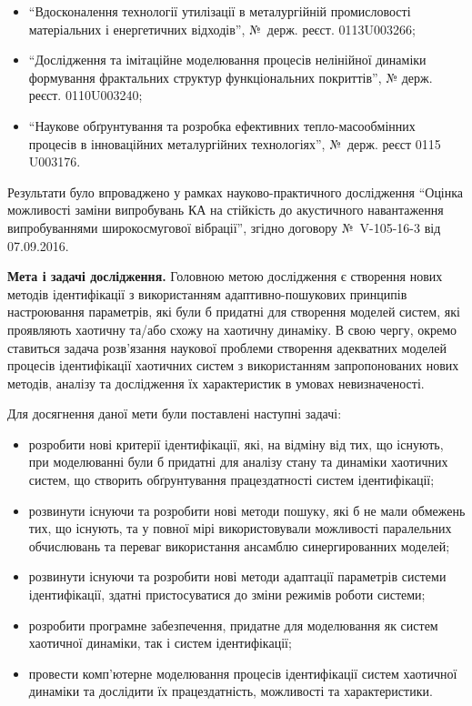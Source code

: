 \documentclass[a4paper,13pt]{atuaref}
\begin{document}
\begin{itemize}


\item
  ``Вдосконалення технології утилізації в металургійній промисловості
  матеріальних і енергетичних відходів'', №~держ. реєст. 0113U003266;

  \item
  ``Дослідження та імітаційне моделювання процесів нелінійної динаміки
  формування фрактальних структур функціональних   покриттів'',
  № держ. реєст. 0110U003240;

  \item
  ``Наукове обґрунтування та розробка ефективних тепло-масообмінних
  процесів в інноваційних металургійних технологіях'', №~держ. реєст 0115 U003176.

\end{itemize}

Результати було впроваджено у рамках науково-практичного дослідження
``Оцінка    можливості заміни випробувань КА на стійкість до акустичного навантаження
випробуваннями широкосмугової вібрації'', згідно договору №~V-105-16-3 від 07.09.2016.

\textbf{Мета і задачі дослідження.}
Головною метою дослідження є створення нових методів ідентифікації з
використанням адаптивно-пошукових принципів настроювання параметрів, які
були б придатні для створення моделей систем, які проявляють хаотичну
та/або схожу на хаотичну динаміку. В свою чергу, окремо ставиться задача
розв'язання наукової проблеми створення адекватних моделей процесів
ідентифікації хаотичних систем з використанням запропонованих нових
методів, аналізу та дослідження їх характеристик в умовах невизначеності.

Для досягнення даної мети були поставлені наступні задачі:

\begin{itemize}

  \item
  розробити нові критерії ідентифікації, які, на відміну від тих, що
  існують, при моделюванні були б придатні для аналізу стану та динаміки
  хаотичних систем, що створить обґрунтування працездатності систем
  ідентифікації;

  \item
  розвинути існуючи та розробити нові методи пошуку, які б не мали
  обмежень тих, що існують, та у повної мірі використовували можливості
  паралельних обчислювань та переваг використання ансамблю
  синергированних моделей;

  \item
  розвинути існуючи та розробити нові методи адаптації параметрів
  системи ідентифікації, здатні пристосуватися до зміни режимів роботи
  системи;

  \item
  розробити програмне забезпечення, придатне для моделювання як систем
  хаотичної динаміки, так і систем ідентифікації;

  \item
  провести комп'ютерне моделювання процесів ідентифікації систем
  хаотичної динаміки та дослідити їх працездатність, можливості та
  характеристики.

\end{itemize}
\end{document}
